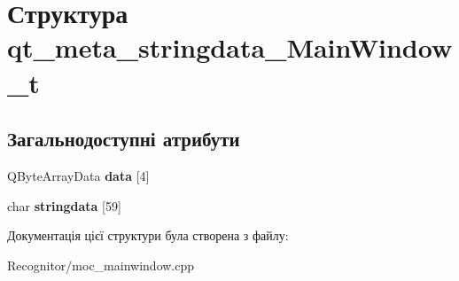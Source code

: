 \hypertarget{structqt__meta__stringdata__MainWindow__t}{\section{Структура qt\-\_\-meta\-\_\-stringdata\-\_\-\-Main\-Window\-\_\-t}
\label{structqt__meta__stringdata__MainWindow__t}
}
\subsection*{Загальнодоступні атрибути}
\begin{DoxyCompactItemize}
\item 
\hypertarget{structqt__meta__stringdata__MainWindow__t_a332d7fa058028f7613b5ba68abb5a7fe}{Q\-Byte\-Array\-Data {\bfseries data} \mbox{[}4\mbox{]}}\label{structqt__meta__stringdata__MainWindow__t_a332d7fa058028f7613b5ba68abb5a7fe}

\item 
\hypertarget{structqt__meta__stringdata__MainWindow__t_a1f75f6e6169dcfddb4a6e5701e72456e}{char {\bfseries stringdata} \mbox{[}59\mbox{]}}\label{structqt__meta__stringdata__MainWindow__t_a1f75f6e6169dcfddb4a6e5701e72456e}

\end{DoxyCompactItemize}


Документація цієї структури була створена з файлу\-:\begin{DoxyCompactItemize}
\item 
Recognitor/moc\-\_\-mainwindow.\-cpp\end{DoxyCompactItemize}
